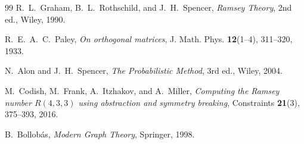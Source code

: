 \documentclass[11pt,a4paper]{article}
\theoremstyle{plain}
\theoremstyle{remark}
\begin{document}
\begin{thebibliography}{99}
R.~L.~Graham, B.~L.~Rothschild, and J.~H.~Spencer,
\emph{Ramsey Theory}, 2nd ed., Wiley, 1990.

R.~E.~A.~C.~Paley,
\emph{On orthogonal matrices},
J. Math. Phys. \textbf{12}(1--4), 311--320, 1933.

N.~Alon and J.~H.~Spencer,
\emph{The Probabilistic Method}, 3rd ed., Wiley, 2004.

M.~Codish, M.~Frank, A.~Itzhakov, and A.~Miller,
\emph{Computing the Ramsey number $R(4,3,3)$ using abstraction
and symmetry breaking},
Constraints \textbf{21}(3), 375--393, 2016.

B.~Bollob{\'a}s,
\emph{Modern Graph Theory}, Springer, 1998.

\end{thebibliography}
\end{document}
